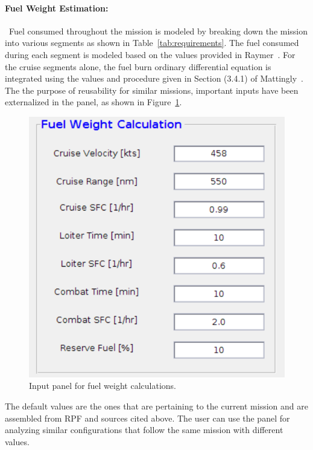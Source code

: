 \documentclass[pdftex,11pt,letter]{article}
\begin{document}
\paragraph{Fuel Weight Estimation:}~Fuel consumed throughout the mission is modeled by breaking down the mission into various segments as shown in Table~\ref{tab:requirements}. The fuel consumed during each segment is modeled based on the values provided in Raymer~\cite{RaymerText}. For the cruise segments alone, the fuel burn ordinary differential equation is integrated using the values and procedure given in Section (3.4.1) of Mattingly~\cite{MattinglyText}. The the purpose of reusability for similar missions, important inputs have been externalized in the panel, as shown in Figure~\ref{panel_fuel_weight}.
 \begin{figure}[h!]
	\centering
	\includegraphics[scale=0.85]{figures/fuel_weight_panel.pdf}
	\caption{Input panel for fuel weight calculations.}
	\label{panel_fuel_weight}
\end{figure}
The default values are the ones that are pertaining to the current mission and are assembled from RPF and sources cited above. The user can use the panel for analyzing similar configurations that follow the same mission with different values.
\end{document}
